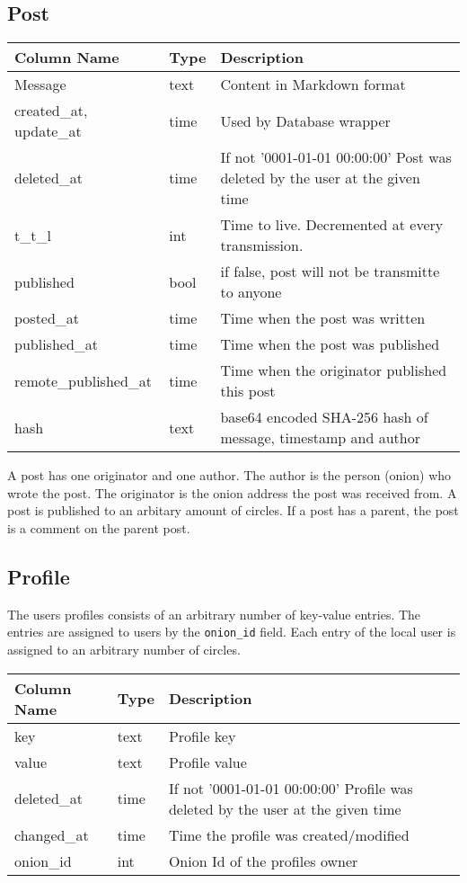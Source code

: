 \documentclass[12pt]{article}
\begin{document}
\subsection{Post}
\begin{tabular}{>{\ttfamily}p{}>{\ttfamily}p{}p{}}
Column Name    & Type & Description \\ \hline \hline
Message                 & text & Content in Markdown format \\
created\_at, update\_at & time & Used by Database wrapper   \\
deleted\_at             & time & If not '0001-01-01 00:00:00' Post was deleted by the user at the given time \\
t\_t\_l                 & int  & Time to live. Decremented at every transmission. \\
published               & bool & if false, post will not be transmitte to anyone \\
posted\_at              & time & Time when the post was written \\
published\_at           & time & Time when the post was published \\
remote\_published\_at   & time & Time when the originator published this post \\
hash                    & text & base64 encoded SHA-256 hash of message, timestamp and author 
\end{tabular}

A post has one originator and one author. The author is the person (onion)
who wrote the post. The originator is the onion address the post was received from. 
A post is published to an arbitary amount of circles.
If a post has a parent, the post is a comment on the parent post.

\subsection{Profile}

The users profiles consists of an arbitrary number of key-value entries.
The entries are assigned to users by the \texttt{onion\_id} field.
Each entry of the local user is assigned to an arbitrary number of circles.

\begin{tabular}{>{\ttfamily}p{}>{\ttfamily}p{}p{}}
Column Name  & Type & Description \\ \hline \hline
key          & text & Profile key   \\
value        & text & Profile value \\
deleted\_at  & time & If not '0001-01-01 00:00:00' Profile was deleted by the user at the given time \\
changed\_at  & time & Time the profile was created/modified \\
onion\_id    & int  & Onion Id of the profiles owner \\
\end{tabular}
\end{document}

